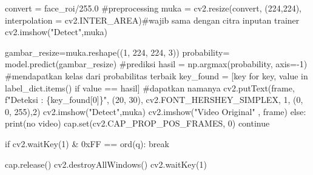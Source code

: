 \documentclass[
  letterpaper,
  DIV=11,
  numbers=noendperiod]{scrreprt}
\newenvironment{Shaded}{\begin{snugshade}}{\end{snugshade}}
\newcommand{\BaseNTok}[1]{\textcolor[rgb]{0.68,0.00,0.00}{#1}}
\newcommand{\BuiltInTok}[1]{\textcolor[rgb]{0.00,0.23,0.31}{#1}}
\newcommand{\CommentTok}[1]{\textcolor[rgb]{0.37,0.37,0.37}{#1}}
\newcommand{\ControlFlowTok}[1]{\textcolor[rgb]{0.00,0.23,0.31}{#1}}
\newcommand{\DecValTok}[1]{\textcolor[rgb]{0.68,0.00,0.00}{#1}}
\newcommand{\FloatTok}[1]{\textcolor[rgb]{0.68,0.00,0.00}{#1}}
\newcommand{\KeywordTok}[1]{\textcolor[rgb]{0.00,0.23,0.31}{#1}}
\newcommand{\NormalTok}[1]{\textcolor[rgb]{0.00,0.23,0.31}{#1}}
\newcommand{\OperatorTok}[1]{\textcolor[rgb]{0.37,0.37,0.37}{#1}}
\newcommand{\SpecialCharTok}[1]{\textcolor[rgb]{0.37,0.37,0.37}{#1}}
\newcommand{\SpecialStringTok}[1]{\textcolor[rgb]{0.13,0.47,0.30}{#1}}
\newcommand{\StringTok}[1]{\textcolor[rgb]{0.13,0.47,0.30}{#1}}
\begin{document}
\begin{Shaded}
\begin{Highlighting}[]
\NormalTok{            convert }\OperatorTok{=}\NormalTok{ face\_roi}\OperatorTok{/}\FloatTok{255.0} \CommentTok{\#preprocessing}
\NormalTok{            muka }\OperatorTok{=}\NormalTok{ cv2.resize(convert, (}\DecValTok{224}\NormalTok{,}\DecValTok{224}\NormalTok{), interpolation }\OperatorTok{=}\NormalTok{ cv2.INTER\_AREA)}\CommentTok{\#wajib sama dengan citra inputan trainer}
\NormalTok{            cv2.imshow(}\StringTok{"Detect"}\NormalTok{,muka)}
            
\NormalTok{            gambar\_resize}\OperatorTok{=}\NormalTok{muka.reshape((}\DecValTok{1}\NormalTok{, }\DecValTok{224}\NormalTok{, }\DecValTok{224}\NormalTok{, }\DecValTok{3}\NormalTok{))}
\NormalTok{            probability}\OperatorTok{=}\NormalTok{ model.predict(gambar\_resize) }\CommentTok{\#prediksi}
\NormalTok{            hasil }\OperatorTok{=}\NormalTok{ np.argmax(probability, axis}\OperatorTok{={-}}\DecValTok{1}\NormalTok{) }\CommentTok{\#mendapatkan kelas dari probabilitas terbaik}
\NormalTok{            key\_found }\OperatorTok{=}\NormalTok{ [key }\ControlFlowTok{for}\NormalTok{ key, value }\KeywordTok{in}\NormalTok{ label\_dict.items() }\ControlFlowTok{if}\NormalTok{ value }\OperatorTok{==}\NormalTok{ hasil] }\CommentTok{\#dapatkan namanya}
\NormalTok{            cv2.putText(frame, }\SpecialStringTok{f"Deteksi : }\SpecialCharTok{\{}\NormalTok{key\_found[}\DecValTok{0}\NormalTok{]}\SpecialCharTok{\}}\SpecialStringTok{"}\NormalTok{, (}\DecValTok{20}\NormalTok{, }\DecValTok{30}\NormalTok{), cv2.FONT\_HERSHEY\_SIMPLEX, }\DecValTok{1}\NormalTok{, (}\DecValTok{0}\NormalTok{, }\DecValTok{0}\NormalTok{, }\DecValTok{255}\NormalTok{),}\DecValTok{2}\NormalTok{)}
\NormalTok{            cv2.imshow(}\StringTok{"Detect"}\NormalTok{,muka)}
\NormalTok{        cv2.imshow(}\StringTok{"Video Original"}\NormalTok{ , frame)}
    \ControlFlowTok{else}\NormalTok{:}
        \BuiltInTok{print}\NormalTok{(}\StringTok{\textquotesingle{}no video\textquotesingle{}}\NormalTok{)}
\NormalTok{        cap.}\BuiltInTok{set}\NormalTok{(cv2.CAP\_PROP\_POS\_FRAMES, }\DecValTok{0}\NormalTok{)}
        \ControlFlowTok{continue}

    \ControlFlowTok{if}\NormalTok{ cv2.waitKey(}\DecValTok{1}\NormalTok{) }\OperatorTok{\&} \BaseNTok{0xFF} \OperatorTok{==} \BuiltInTok{ord}\NormalTok{(}\StringTok{\textquotesingle{}q\textquotesingle{}}\NormalTok{):}
        \ControlFlowTok{break}
    
\NormalTok{cap.release()}
\NormalTok{cv2.destroyAllWindows()}
\NormalTok{cv2.waitKey(}\DecValTok{1}\NormalTok{)}
\end{Highlighting}
\end{Shaded}
\end{document}
